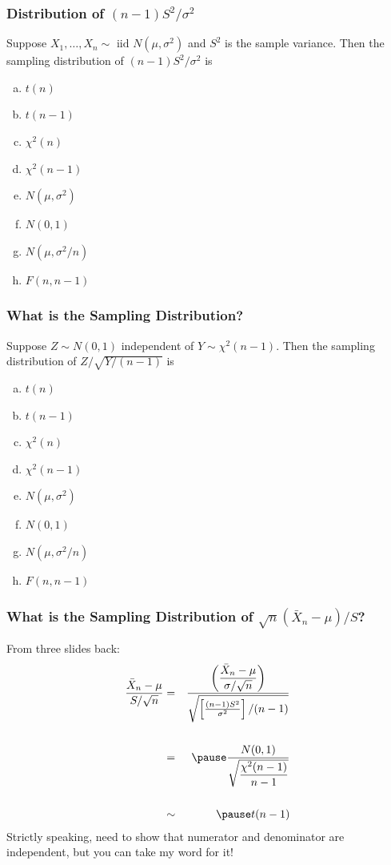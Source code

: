 \documentclass{beamer}
\begin{document}
\begin{frame}[c]
\frametitle{Distribution of $(n-1)S^2/\sigma^2$ }
    
    Suppose $X_1, \hdots, X_n \sim \mbox{ iid } N(\mu, \sigma^2)$ and $S^2$ is the sample variance. Then the sampling distribution of \alert{$(n-1)S^2/\sigma^2$} is

    \begin{enumerate}[(a)]
    	\item $t(n)$
    	\item $t(n-1)$
    	\item $\chi^2(n)$
    	\item $\chi^2(n-1)$
    	\item $N(\mu, \sigma^2)$
    	\item $N(0,1)$
    	\item $N(\mu, \sigma^2/n)$
    	\item $F(n, n-1)$
    \end{enumerate}


\end{frame}

\begin{frame}[c]\frametitle{What is the Sampling Distribution? }
    
Suppose $Z\sim N(0,1)$ independent of $Y \sim \chi^2(n-1)$. Then the sampling distribution of \alert{$Z/\sqrt{Y/(n-1)}$} is

    \begin{enumerate}[(a)]
    	\item $t(n)$
    	\item $t(n-1)$
    	\item $\chi^2(n)$
    	\item $\chi^2(n-1)$
    	\item $N(\mu, \sigma^2)$
    	\item $N(0,1)$
    	\item $N(\mu, \sigma^2/n)$
    	\item $F(n, n-1)$
    \end{enumerate}



\end{frame}

\begin{frame}
\frametitle{What is the Sampling Distribution of $\sqrt{n}(\bar{X}_n-\mu)/S$?}
From three slides back:
\begin{eqnarray*}
	\frac{\bar{X}_n - \mu}{S/\sqrt{n}} &=& \frac{\displaystyle \left(\frac{\bar{X}_n - \mu}{\sigma/\sqrt{n}}\right)}{\sqrt{\left[\frac{(n-1)S^2}{\sigma^2}\right]/(n-1)}} \\ \\ 
		&=&\pause \frac{N(0,1)}{\sqrt{\displaystyle\frac{\chi^2(n-1)}{n-1}}}\\ \\ 
		&\sim& \pause t(n-1)
\end{eqnarray*}
\pause
\alert{Strictly speaking, need to show that numerator and denominator are independent, but you can take my word for it!}
\end{frame}
\end{document}
